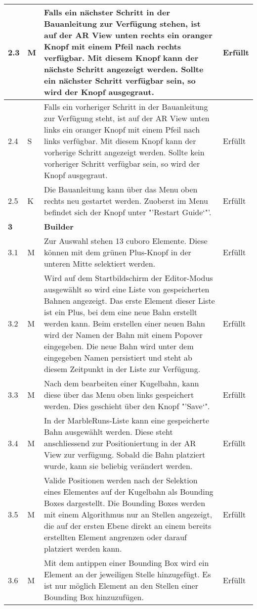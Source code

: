 \begin{longtable}{l l p{10cm} l}
	\hline
	2.3 & M & Falls ein nächster Schritt in der Bauanleitung zur Verfügung stehen, ist auf der AR View unten rechts ein oranger Knopf mit einem Pfeil nach rechts verfügbar. Mit diesem Knopf kann der nächste Schritt angezeigt werden. Sollte ein nächster Schritt verfügbar sein, so wird der Knopf ausgegraut. & Erfüllt \\
	\hline
	2.4 & S & Falls ein vorheriger Schritt in der Bauanleitung zur Verfügung steht, ist auf der AR View unten links ein oranger Knopf mit einem Pfeil nach links verfügbar. Mit diesem Knopf kann der vorherige Schritt angezeigt werden. Sollte kein vorheriger Schritt verfügbar sein, so wird der Knopf ausgegraut. & Erfüllt \\
	\hline
	2.5 & K & Die Bauanleitung kann über das Menu oben rechts neu gestartet werden. Zuoberst im Menu befindet sich der Knopf unter "'Restart Guide`"'. & Erfüllt \\
	\hline
	\textbf{3} & & \textbf{Builder} & \\
	\hline
	3.1 & M & Zur Auswahl stehen 13 cuboro Elemente. Diese können mit dem grünen Plus-Knopf in der unteren Mitte selektiert werden. & Erfüllt \\
	\hline
	3.2 & M & Wird auf dem Startbildschirm der Editor-Modus ausgewählt so wird eine Liste von gespeicherten Bahnen angezeigt. Das erste Element dieser Liste ist ein Plus, bei dem eine neue Bahn erstellt werden kann. Beim erstellen einer neuen Bahn wird der Namen der Bahn mit einem Popover eingegeben. Die neue Bahn wird unter dem eingegeben Namen persistiert und steht ab diesem Zeitpunkt in der Liste zur Verfügung. & Erfüllt \\
	\hline
	3.3 & M & Nach dem bearbeiten einer Kugelbahn, kann diese über das Menu oben links gespeichert werden. Dies geschieht über den Knopf "'Save`". & Erfüllt \\
	\hline
	3.4 & M & In der MarbleRuns-Liste kann eine gespeicherte Bahn ausgewählt werden. Diese steht anschliessend zur Positioniertung in der AR View zur verfügung. Sobald die Bahn platziert wurde, kann sie beliebig verändert werden. & Erfüllt \\
	\hline
	3.5 & M & Valide Positionen werden nach der Selektion eines Elementes auf der Kugelbahn als Bounding Boxes dargestellt. Die Bounding Boxes werden mit einem Algorithmus nur an Stellen angezeigt, die auf der ersten Ebene direkt an einem bereits erstellten Element angrenzen oder darauf platziert werden kann. & Erfüllt \\
	\hline
	3.6 & M & Mit dem antippen einer Bounding Box wird ein Element an der jeweiligen Stelle hinzugefügt. Es ist nur möglich Element an den Stellen einer Bounding Box hinzuzufügen. & Erfüllt \\

\end{longtable}
